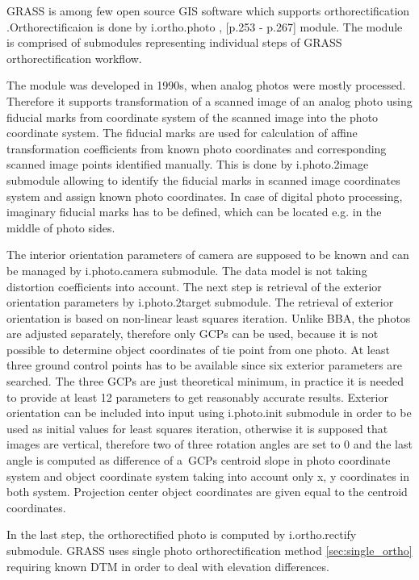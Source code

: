 \documentclass[a4paper,12pt]{article}
\begin{document}
GRASS is among few open source GIS software which supports orthorectification
\cite{rocchini2012robust}.Orthorectificaion is done 
by i.ortho.photo \cite{i.ortho.photo}, \cite{neteler2008open}[p.253 - p.267] module.
The module is comprised of submodules representing individual steps of 
GRASS orthorectification workflow.

The module was developed in 1990s,  
when analog photos were mostly processed. Therefore it supports 
 transformation of a scanned image of an analog photo using fiducial marks from coordinate system of the scanned image into 
 the photo coordinate system. The fiducial marks are used for calculation of 
 affine transformation coefficients from known photo coordinates 
 and corresponding scanned image points identified manually. 
 This is done by i.photo.2image submodule allowing to identify the fiducial 
 marks in scanned image coordinates system and assign known photo coordinates.
  In case of digital photo processing, imaginary fiducial marks has to be defined, which
can be located e.g. in the middle of photo sides.  
  
The interior orientation parameters of camera are supposed to be known and can 
be managed by i.photo.camera submodule.
The data model is not taking distortion 
coefficients into account. 
The next step is retrieval of the exterior orientation parameters by i.photo.2target submodule.  
The retrieval 
of exterior orientation is based on non-linear least squares iteration. Unlike BBA,
the photos are adjusted separately, therefore only GCPs can be used,
because it is not possible to determine object coordinates of tie point from one photo.
At least three ground control points has to be available since six exterior parameters are 
searched. The three GCPs are just theoretical minimum, in practice it is needed to provide at least 12 parameters
to get reasonably accurate results. Exterior orientation 
can be included into input using i.photo.init submodule in order to be used as initial values for least squares iteration,
otherwise it is supposed that images are vertical, therefore two of three rotation
angles are set to 0 and the last angle is computed as difference of a~GCPs centroid  slope
in photo coordinate system and object coordinate system taking into account only x, y coordinates in both system.
Projection center object coordinates are given equal to the centroid coordinates.

In the last step, the orthorectified photo is computed by i.ortho.rectify submodule. GRASS uses single photo orthorectification
method \ref{sec:single_ortho} requiring known DTM in order to deal with elevation differences. 
\end{document}
